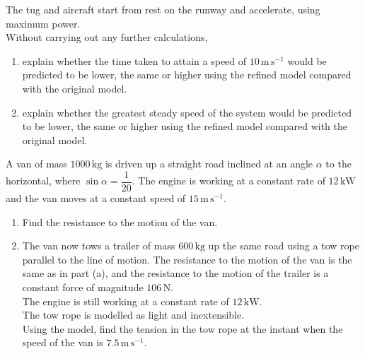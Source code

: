 \documentclass[leqno]{article}
\begin{document}
\begin{enumerate}[
  label=\textbf{\arabic*.},
  leftmargin=*,
  topsep=0pt,
  partopsep=0pt,
  parsep=0pt
]
\begin{enumerate}[label=\textbf{(\roman*)}]
  The tug and aircraft start from rest on the runway and accelerate, using maximum power. \\

  Without carrying out any further calculations,
  \begin{enumerate}[label=(\alph*)]
    \item explain whether the time taken to attain a speed of $10\,\mathrm{m\,s^{-1}}$ would be predicted to be lower, the same or higher using the refined model compared with the original model. 
    \item explain whether the greatest steady speed of the system would be predicted to be lower, the same or higher using the refined model compared with the original model. 
  \end{enumerate}
\end{enumerate}

\newpage

\questionitem

A van of mass $1000\,\mathrm{kg}$ is driven up a straight road inclined at an angle $\alpha$ to the horizontal, where $\sin\alpha=\dfrac{1}{20}$. The engine is working at a constant rate of $12\,\mathrm{kW}$ and the van moves at a constant speed of $15\,\mathrm{m\,s^{-1}}$. \\

\begin{enumerate}[label=\textbf{(\alph*)}]
  \item Find the resistance to the motion of the van.  \\
  \item The van now tows a trailer of mass $600\,\mathrm{kg}$ up the same road using a tow rope parallel to the line of motion. The resistance to the motion of the van is the same as in part (a), and the resistance to the motion of the trailer is a constant force of magnitude $106\,\mathrm{N}$. \\

  The engine is still working at a constant rate of $12\,\mathrm{kW}$. \\

  The tow rope is modelled as light and inextensible. \\

  Using the model, find the tension in the tow rope at the instant when the speed of the van is $7.5\,\mathrm{m\,s^{-1}}$.  \\
\end{enumerate}


\end{enumerate}
\end{document}
